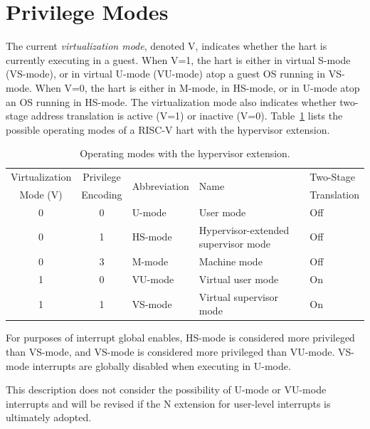 \section{Privilege Modes}

The current {\em virtualization mode}, denoted V, indicates whether the hart
is currently executing in a guest.
When V=1, the hart is either in virtual S-mode (VS-mode), or in virtual U-mode
(VU-mode) atop a guest OS running in VS-mode.
When V=0, the hart is either in M-mode, in HS-mode, or in U-mode atop an OS
running in HS-mode.
The virtualization mode also indicates whether two-stage address translation
is active (V=1) or inactive (V=0).  Table~\ref{h-operating-modes} lists the
possible operating modes of a RISC-V hart with the hypervisor extension.

\begin{table}[h!]
\begin{center}
\begin{tabular}{|c|c||l|l|l|}
  \hline
   Virtualization & Privilege & \multirow{2}{*}{Abbreviation} & \multirow{2}{*}{Name} & Two-Stage \\
   Mode (V)       & Encoding  &                               &                       & Translation \\ \hline
   0              & 0         & U-mode  & User mode & Off \\
   0              & 1         & HS-mode & Hypervisor-extended supervisor mode & Off \\
   0              & 3         & M-mode  & Machine mode & Off \\
  \hline
   1              & 0         & VU-mode & Virtual user mode & On \\
   1              & 1         & VS-mode & Virtual supervisor mode & On \\
  \hline
 \end{tabular}
\end{center}
\caption{Operating modes with the hypervisor extension.}
\label{h-operating-modes}
\end{table}

For purposes of interrupt global enables, HS-mode is considered more privileged
than VS-mode, and VS-mode is considered more privileged than VU-mode.
VS-mode interrupts are globally disabled when executing in U-mode.

\begin{commentary}
This description does not consider the possibility of U-mode or VU-mode interrupts and will be revised if the N extension for user-level interrupts is ultimately adopted.
\end{commentary}


